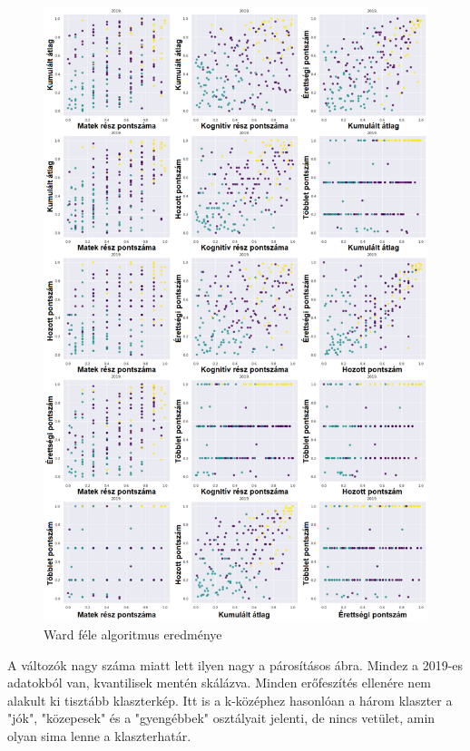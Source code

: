 \documentclass[12pt]{article}
\begin{document}
\begin{figure}[H]
\centering
\includegraphics[scale = 0.65]{kepek/klacterward.png}
\caption{Ward féle algoritmus eredménye}
\label{fig:klacterward}
\end{figure}

A változók nagy száma miatt lett ilyen nagy a párosításos ábra. Mindez a 2019-es adatokból van, kvantilisek mentén skálázva. Minden erőfeszítés ellenére nem alakult ki tisztább klaszterkép. Itt is a k-középhez hasonlóan a három klaszter a "jók", "közepesek" és a "gyengébbek" osztályait jelenti, de nincs vetület, amin olyan sima lenne a klaszterhatár.
\end{document}

